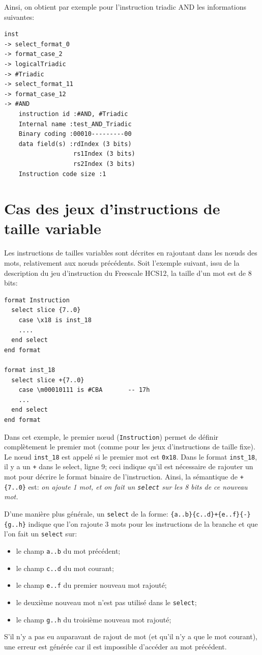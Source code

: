 Ainsi, on obtient par exemple pour l'instruction triadic AND les informations suivantes:
\begin{verbatim}
inst 
-> select_format_0 
-> format_case_2 
-> logicalTriadic 
-> #Triadic 
-> select_format_11 
-> format_case_12 
-> #AND
	instruction id :#AND, #Triadic
	Internal name :test_AND_Triadic
	Binary coding :00010---------00
	data field(s) :rdIndex (3 bits)
	               rs1Index (3 bits)
	               rs2Index (3 bits)
	Instruction code size :1
\end{verbatim}


\section{Cas des jeux d'instructions de taille variable}
\label{sec:formatTailleVariable}
Les instructions de tailles variables sont décrites en rajoutant dans les nœuds des mots, relativement aux nœuds précédents.
Soit l'exemple suivant, issu de la description du jeu d'instruction du Freescale HCS12, la taille d'un mot est de 8 bits:
\begin{lstlisting}
format Instruction 
  select slice {7..0}
    case \x18 is inst_18 
    ....
  end select
end format

format inst_18 
  select slice +{7..0}
    case \m00010111 is #CBA       -- 17h
    ...
  end select
end format
\end{lstlisting}
Dans cet exemple, le premier nœud (\texttt{Instruction}) permet de définir complètement le premier mot (comme pour les jeux d'instructions de taille fixe). Le nœud \texttt{inst\_18} est appelé si le premier mot est \texttt{0x18}. Dans le format \texttt{inst\_18}, il y a un \texttt{+} dans le select, ligne 9; ceci indique qu'il est nécessaire de rajouter un mot pour décrire le format binaire de l'instruction. Ainsi, la sémantique de \texttt{+\{7..0\}} est: \emph{on ajoute 1 mot, et on fait un \texttt{select} sur les 8 bits de ce nouveau mot.}

D'une manière plus générale, un \texttt{select} de la forme: \texttt{\{a..b\}\{c..d\}+\{e..f\}\{-\}\{g..h\}} indique que l'on rajoute 3 mots pour les instructions de la branche et que l'on fait un \texttt{select} sur:
\begin{itemize}
\item le champ \texttt{a..b} du mot précédent;
\item le champ \texttt{c..d} du mot courant;
\item le champ \texttt{e..f} du premier nouveau mot rajouté;
\item le deuxième nouveau mot n'est pas utilisé dans le \texttt{select};
\item le champ \texttt{g..h} du troisième nouveau mot rajouté;
\end{itemize}
S'il n'y a pas eu auparavant de rajout de mot (et qu'il n'y a que le mot courant), une erreur est générée car il est impossible d'accéder au mot précédent.

